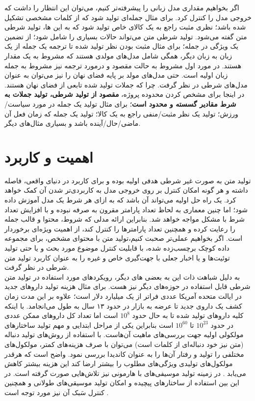 اگر بخواهیم مقداری \task{} مدل زبانی را پیشرفته‌تر کنیم، می‌توان این انتظار را داشت که خروجی مدل را کنترل کرد. برای مثال جمله‌ای تولید شود که از کلمات مشخصی تشکیل شده باشد؛ نظری مثبت راجع به یک کالای خاص تولید شود که به این \task{}‌ها، تولید شرطی متن گفته می‌شود. تولید شرطی متن می‌تواند حالات بسیاری را شامل شود؛ از تضمین یک ویژگی در جمله؛ برای مثال مثبت بودن نظر تولید شده تا ترجمه یک جمله از یک زبان به زبان دیگر، همگی شامل مدل‌های مولدی هستند که مشروط به یک مقدار هستند. در مورد اول مشروط به حالت مقصود و درمورد ترجمه نیز مشروط به جمله زبان اولیه است. حتی مدل‌های  مولد بر پایه فضای نهان را نیز می‌توان به عنوان مدل‌های شرطی در نظر گرفت. چرا که جملات تولید شده تابعی از فضای نهان هستند. در اینجا برای مشخص کردن محدوده پروژه،
{\bf
مقصود از تولید شرطی، تولید جملات به شرط مقادیر گسسته و محدود است}؛ برای مثال تولید یک جمله در مورد سیاست/ورزش؛ تولید یک نظر مثبت/منفی راجع به یک کالا؛ تولید یک جمله که زمان فعل آن ماضی/حال/آینده باشد و بسیاری مثال‌های دیگر.
\section{اهمیت و کاربرد}
تولید متن به صورت غیر شرطی هدفی اولیه بوده و برای کاربرد در دنیای واقعی، فاصله داشته و هر گونه امکان کنترل بر روی خروجی مدل به کاربردی‌تر شدن آن کمک خواهد کرد. یک راه حل اولیه می‌تواند آن باشد که به ازای هر شرط یک مدل آموزش داده شود؛ اما چنین معماری به لحاظ تعداد پارامتر مقرون به صرفه نبوده و با افزایش تعداد شرط با مشکل مواجه خواهد شد. بنابراین ارائه مدلی  که شروط، محتوا و قالب جمله را رعایت کرده و همچنین تعداد پارامترها را کنترل کند، از اهمیت ویژه‌ای برخوردار است. اگر بخواهیم عملی‌تر صحبت کنیم،تولید متن با محتوای مشخص، 
برای مجموعه داده کوچک برچسب‌زده شده، 
با قابلیت کنترل موضوع مورد بحث و یا حتی تولید توئیت‌ها و یا اخبار جعلی با جهت‌گیری خاص و غیره را به عنوان کاربرد تولید متن شرطی در نظر گرفت.
\\
به دلیل شباهت ذات این \task{} به بعضی \task{}‌های دیگر، رویکردهای مورد استفاده در تولید متن شرطی قابل استفاده در حوزه‌های دیگر نیز هست. برای مثال هزینه تولید دارو‌های جدید در ایالت متحده آمریکا عددی فراتر از یک میلیارد دلار است؛ علاوه بر این مدت زمان کشف یک داروی جدید تا عرضه به بازار در حدود ۱۳ سال به طول می‌انجامد. با اینکه کلیه دارو‌های تولید شده تا به حال حدود $10^8$ است اما تعداد کل دارو‌های ممکن عددی در حدود $10^{23}$ تا $10^{60}$ است بنابراین یکی از مراحل ابتدایی و مهم تولید ساختارهای مولکولی اولیه جهت بررسی‌های ماهیت آن‌هاست. با استفاده از روش‌های تولید دنباله (متن نیز خود دنباله‌ای از کلمات است) می‌توان با صرف هزینه‌های کمتر، مولکول‌های مختلفی را تولید و رفتار آن‌ها را به عنوان کاندیدا بررسی نمود. واضح است که هرقدر مولکول‌های تولیدی ویژگی‌های مطلوب را بیشتر ارضا کند این هزینه بیشتر کاهش می‌یابد \cite{molecule}. در زمینه تولید موسیفی‌های با هارمونی نیز تلاش‌هایی صورت گرفته است. در این بین استفاده از ساختارهای پیچیده و امکان تولید موسیقی‌های طولانی  و همچنین کنترل سَبک آن نیز مورد توجه است \cite{vae_music, music}.

